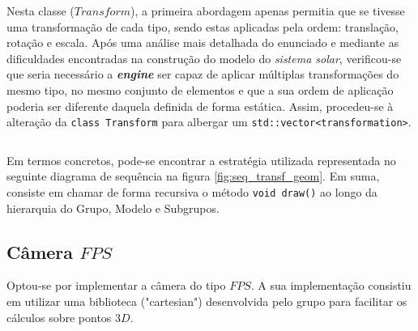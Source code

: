 \documentclass[runningheads]{llncs}
\newenvironment{code}{\captionsetup{type=listing}}{}
\begin{document}
\begin{code}
    \label{code:group_h}
    \inputminted[firstline=12, lastline=18]{cpp}{../../Group.h}
\end{code}

Nesta classe ($Transform$), a primeira abordagem apenas permitia que se tivesse uma transformação
de cada tipo, sendo estas aplicadas pela ordem: translação, rotação e escala.
Após uma análise mais detalhada do enunciado e mediante as dificuldades encontradas
na construção do modelo do \textit{sistema solar}, verificou-se que seria necessário
a \textit{\textbf{engine}} ser capaz de aplicar múltiplas transformações do mesmo tipo,
no mesmo conjunto de elementos e que a sua ordem de aplicação poderia ser diferente daquela
definida de forma estática.
Assim, procedeu-se à alteração da \texttt{class Transform} para albergar um
\texttt{std::vector<transformation>}.

\begin{code}
    \label{code:struct_transformation}
    \inputminted[firstline=17, lastline=21]{cpp}{../../Transform.h}
\end{code}

Em termos concretos, pode-se encontrar a estratégia utilizada
representada no seguinte diagrama de sequência na figura \ref{fig:seq_transf_geom}.
Em suma, consiste em chamar de forma recursiva o método \texttt{void draw()} ao longo
da hierarquia do Grupo, Modelo e Subgrupos.

\subsection{Câmera $FPS$} \label{sec:camera_fps}
Optou-se por implementar a câmera do tipo $FPS$.
A sua implementação consistiu em utilizar uma biblioteca ("cartesian") desenvolvida pelo grupo para facilitar os cálculos
sobre pontos $3D$.
\end{document}

